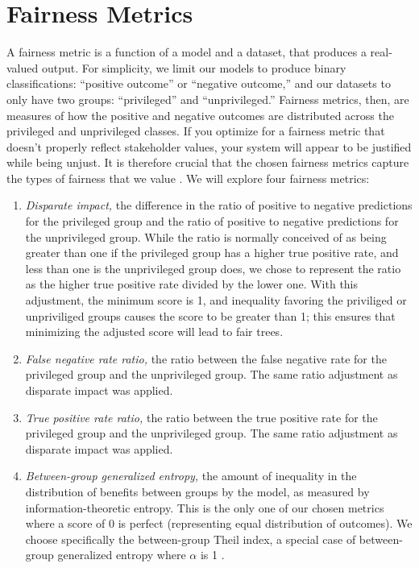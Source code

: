 \documentclass[twoside]{article}
\begin{document}
\section{Fairness Metrics}
A fairness metric is a function of a model and a dataset, that produces a real-valued output. For simplicity, we limit our models to produce binary classifications: “positive outcome” or “negative outcome,” and our datasets to only have two groups: “privileged” and “unprivileged.” Fairness metrics, then, are measures of how the positive and negative outcomes are distributed across the privileged and unprivileged classes. If you optimize for a fairness metric that doesn’t properly reflect stakeholder values, your system will appear to be justified while being unjust. It is therefore crucial that the chosen fairness metrics capture the types of fairness that we value \citep{Binns:2017}. We will explore four fairness metrics:

\begin{enumerate}
	\item \textit{Disparate impact,} the difference in the ratio of positive to negative predictions for the privileged group and the ratio of positive to negative predictions for the unprivileged group. While the ratio is normally conceived of as being greater than one if the privileged group has a higher true positive rate, and less than one is the unprivileged group does, we chose to represent the ratio as the higher true positive rate divided by the lower one. With this adjustment, the minimum score is 1, and inequality favoring the priviliged or unpriviliged groups causes the score to be greater than 1; this ensures that minimizing the adjusted score will lead to fair trees.
	\item \textit{False negative rate ratio,} the ratio between the false negative rate for the privileged group and the unprivileged group. The same ratio adjustment as disparate impact was applied.
	\item \textit{True positive rate ratio,} the ratio between the true positive rate for the privileged group and the unprivileged group. The same ratio adjustment as disparate impact was applied.
	\item \textit{Between-group generalized entropy,} the amount of inequality in the distribution of benefits between groups by the model, as measured by information-theoretic entropy. This is the only one of our chosen metrics where a score of 0 is perfect (representing equal distribution of outcomes). We choose specifically the between-group Theil index, a special case of between-group generalized entropy where $\alpha$ is 1 \citep{Speicher:2018}.
\end{enumerate}
\end{document}
